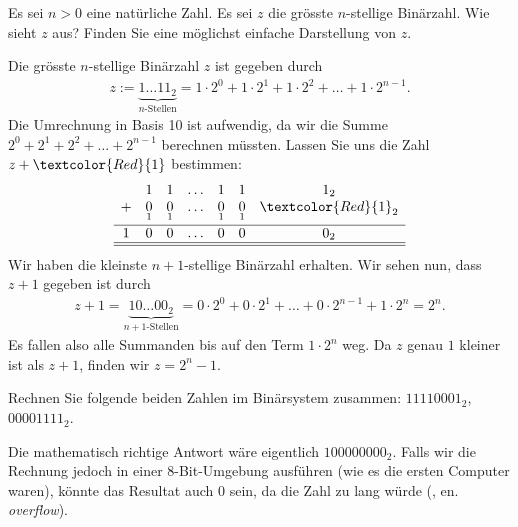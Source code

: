\begin{mychallenge}
	Es sei $n>0$ eine natürliche Zahl. Es sei $z$ die grösste $n$-stellige Binärzahl. Wie sieht $z$ aus? Finden Sie eine möglichst einfache Darstellung von $z$.
	\begin{myanswer}
		Die grösste $n$-stellige Binärzahl $z$ ist gegeben durch
		\begin{align*}
			z := \underbrace{1\ldots 11_2}_{n\text{-Stellen}} = 1\cdot 2^0 + 1\cdot 2^1 + 1\cdot 2^2 + \ldots + 1\cdot 2^{n-1}.
		\end{align*}
		Die Umrechnung in Basis 10 ist aufwendig, da wir die Summe $2^0 + 2^1 + 2^2 + \ldots + 2^{n-1}$ berechnen müssten. Lassen Sie uns die Zahl $z+\textcolor{Red}{1}$ bestimmen:
		\[
			\begin{array}{ccccccc}
				  & 1               & 1               & \ldots & 1               & 1               & 1_2                               \\
				+ & \underset{1}{0} & \underset{1}{0} & \ldots & \underset{1}{0} & \underset{1}{0} & \underset{}{\textcolor{Red}{1}_2} \\
				\hline
				1 & 0               & 0               & \ldots & 0               & 0               & 0_2                               \\\hline\hline
			\end{array}
		\]
		Wir haben die kleinste $n+1$-stellige Binärzahl erhalten. Wir sehen nun, dass $z+1$ gegeben ist durch
		\begin{align*}
			z+1 = \underbrace{10\ldots 00_2}_{n+1\text{-Stellen}} = 0\cdot 2^0 + 0\cdot 2^1 + \ldots + 0\cdot 2^{n-1} + 1\cdot 2^n = 2^n.
		\end{align*}
		Es fallen also alle Summanden bis auf den Term $ 1\cdot 2^n$ weg. Da $z$ genau $1$ kleiner ist als $z+1$, finden wir $z = 2^n - 1$.
	\end{myanswer}
\end{mychallenge}

\begin{myexercise}\label{myexercise:overflow}
	Rechnen Sie folgende beiden Zahlen im Binärsystem zusammen: $11110001_2$, $00001111_2$.
	\begin{myanswer}
		Die mathematisch richtige Antwort wäre eigentlich $100000000_2$. Falls wir die Rechnung jedoch in einer 8-Bit-Umgebung ausführen (wie es die ersten Computer waren), könnte das Resultat auch 0 sein, da die Zahl zu lang würde (, en. \textit{overflow}).
	\end{myanswer}
\end{myexercise}

